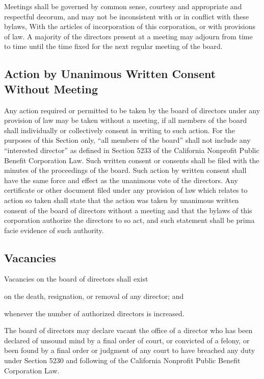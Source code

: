 \documentclass{article}
\begin{document}
	Meetings shall be governed by common sense, courtesy and appropriate and respectful decorum, and may not be inconsistent with or in conflict with these bylaws, With the articles of incorporation of this corporation, or with provisions of law. A majority of the directors present at a meeting may adjourn from time to time until the time fixed for the next regular meeting of the board.
	
	\subsection{Action by Unanimous Written Consent Without Meeting}
	Any action required or permitted to be taken by the board of directors under any provision of law may be taken without a meeting, if all members of the board shall individually or collectively consent in writing to such action. For the purposes of this Section only, ``all members of the board'' shall not include any ``interested director'' as defined in Section 5233 of the California Nonprofit Public Benefit Corporation Law. Such written consent or consents shall be filed with the minutes of the proceedings of the board. Such action by written consent shall have the same force and effect as the unanimous vote of the directors. Any certificate or other document filed under any provision of law which relates to action so taken shall state that the action was taken by unanimous written consent of the board of directors without a meeting and that the bylaws of this corporation authorize the directors to so act, and such statement shall be prima facie evidence of such authority.
	\subsection{Vacancies}
	Vacancies on the board of directors shall exist 
	\begin{inparaenum}[\itshape 1\upshape)]
		\item on the death, resignation, or removal of any director; and
		\item whenever the number of authorized directors is increased.
	\end{inparaenum}
	
	The board of directors may declare vacant the office of a director who has been declared of unsound mind by a final order of court, or convicted of a felony, or been found by a final order or judgment of any court to have breached any duty under Section 5230 and following of the California Nonprofit Public Benefit Corporation Law.
	
\end{document}
